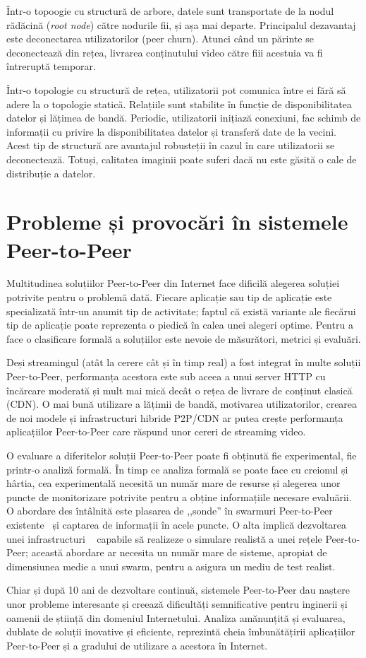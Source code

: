 Într-o topoogie cu structură de arbore, datele sunt transportate de la nodul
rădăcină (\textit{root node}) către nodurile fii, și așa mai departe.
Principalul dezavantaj este deconectarea utilizatorilor (peer churn). Atunci
când un părinte se deconectează din rețea, livrarea conținutului video către
fiii acestuia va fi întreruptă temporar.

Într-o topologie cu structură de rețea, utilizatorii pot comunica între ei
fără să adere la o topologie statică. Relațiile sunt stabilite în funcție de
disponibilitatea datelor și lățimea de bandă. Periodic, utilizatorii inițiază
conexiuni, fac schimb de informații cu privire la disponibilitatea datelor și
transferă date de la vecini. Acest tip de structură are avantajul robusteții
în cazul în care utilizatorii se deconectează. Totuși, calitatea imaginii poate
suferi dacă nu este găsită o cale de distribuție a datelor.

\section{Probleme și provocări în sistemele Peer-to-Peer}
\label{sec:p2p-systems:issues}

Multitudinea soluțiilor Peer-to-Peer din Internet face dificilă alegerea
soluției potrivite pentru o problemă dată. Fiecare aplicație sau tip de
aplicație este specializată într-un anumit tip de activitate; faptul că
există variante ale fiecărui tip de aplicație poate reprezenta o piedică în
calea unei alegeri optime. Pentru a face o clasificare formală a soluțiilor
este nevoie de măsurători, metrici și evaluări.

Deși streamingul (atât la cerere cât și în timp real) a fost integrat în multe
soluții Peer-to-Peer, performanța acestora este sub aceea a unui server HTTP
cu încărcare moderată și mult mai mică decât o rețea de livrare de conținut
clasică (CDN). O mai bună utilizare a lățimii de bandă, motivarea
utilizatorilor, crearea de noi modele și infrastructuri hibride P2P/CDN ar putea
crește performanța aplicațiilor Peer-to-Peer care răspund unor cereri de
streaming video.

O evaluare a diferitelor soluții Peer-to-Peer poate fi obținută fie
experimental, fie printr-o analiză formală. În timp ce analiza formală se
poate face cu creionul și hârtia, cea experimentală necesită un număr mare de
resurse și alegerea unor puncte de monitorizare potrivite pentru a obține
informațiile necesare evaluării. O abordare des întâlnită este plasarea de
,,sonde'' în swarmuri Peer-to-Peer existente~\cite{corr-overlay} și captarea
de informații în acele puncte. O alta implică dezvoltarea unei infrastructuri
~\cite{bt-vi} capabile să realizeze o simulare realistă a unei rețele
Peer-to-Peer; această abordare ar necesita un număr mare de sisteme, apropiat
de dimensiunea medie a unui swarm, pentru a asigura un mediu de test realist.

Chiar și după 10 ani de dezvoltare continuă, sistemele Peer-to-Peer dau naștere
unor probleme interesante și creează dificultăți semnificative pentru
inginerii și oamenii de știință din domeniul Internetului. Analiza
amănunțită și evaluarea, dublate de soluții inovative și eficiente, reprezintă
cheia îmbunătățirii aplicațiilor Peer-to-Peer și a gradului de utilizare
a acestora în Internet.
